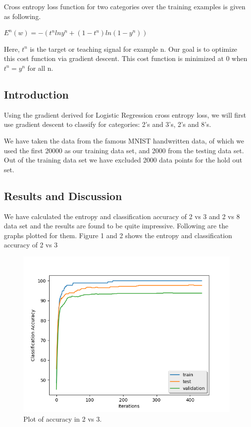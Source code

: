 \documentclass{article} %
\begin{document}
Cross entropy loss function for two categories over the training examples is given as following.\\

\begin{center}
$E^n(w) = -(t^n lny^n + (1-t^n) ln(1-y^n))$\\
\hfill\break
\hfill\break
\end{center}

Here, $t^n$ is the target or teaching signal for example n. Our goal is to optimize this cost function via gradient descent. This cost function is minimized at 0 when $t^n = y^n$ for all n.
\subsection{Introduction}
Using the gradient derived for Logistic Regression cross entropy loss, we will first use gradient descent to classify for categories: 2's and 3's, 2's and 8's.  

We have taken the data from the famous MNIST handwritten data, of which we used the first 20000 as our training data set, and 2000 from the testing data set. Out of the training data set we have excluded 2000 data points for the hold out set.\\

\subsection{Results and Discussion}
We have calculated the entropy and classification accuracy of 2 vs 3 and 2 vs 8 data set and the results are found to be quite impressive. Following are the graphs plotted for them. Figure 1 and 2 shows the entropy and classification accuracy of 2 vs 3

\begin{figure}[H]
\begin{center}
\includegraphics[width=0.8\linewidth]{plt_2vs3_accuracy.png}
\end{center}
\caption{Plot of accuracy in 2 vs 3.}
\end{figure}
\end{document}
